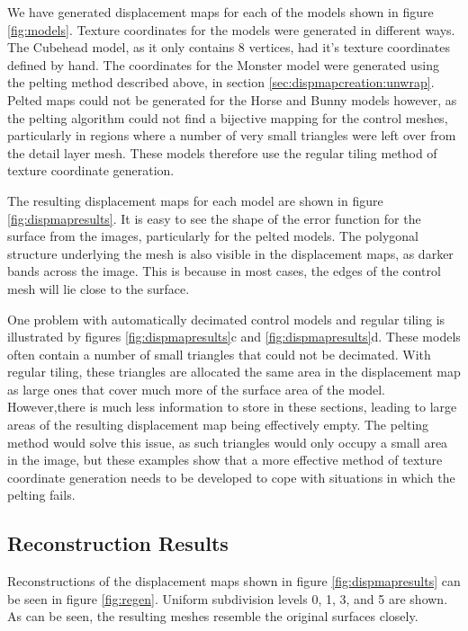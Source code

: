 We have generated displacement maps for each of the models shown in figure \ref{fig:models}. Texture coordinates for the models were generated in different ways. The Cubehead model, as it only contains 8 vertices, had it's texture coordinates defined by hand. The coordinates for the Monster model were generated using the pelting method described above, in section \ref{sec:dispmapcreation:unwrap}. Pelted maps could not be generated for the Horse and Bunny models however, as the pelting algorithm could not find a bijective mapping for the control meshes, particularly in regions where a number of very small triangles were left over from the detail layer mesh. These models therefore use the regular tiling method of texture coordinate generation.

The resulting displacement maps for each model are shown in figure \ref{fig:dispmapresults}. It is easy to see the shape of the error function for the surface from the images, particularly for the pelted models. The polygonal structure underlying the mesh is also visible in the displacement maps, as darker bands across the image. This is because in most cases, the edges of the control mesh will lie close to the surface.

One problem with automatically decimated control models and regular tiling is illustrated by figures \ref{fig:dispmapresults}c and \ref{fig:dispmapresults}d. These models often contain a number of small triangles that could not be decimated. With regular tiling, these triangles are allocated the same area in the displacement map as large ones that cover much more of the surface area of the model. However,there is much less information to store in these sections, leading to large areas of the resulting displacement map being effectively empty. The pelting method would solve this issue, as such triangles would only occupy a small area in the image, but these examples show that a more effective method of texture coordinate generation needs to be developed to cope with situations in which the pelting fails.

\subsection{\label{sec:dispmapanim:reconstruction:results}Reconstruction Results}

Reconstructions of the displacement maps shown in figure \ref{fig:dispmapresults} can be seen in figure \ref{fig:regen}. Uniform subdivision levels 0, 1, 3, and 5 are shown. As can be seen, the resulting meshes resemble the original surfaces closely.

